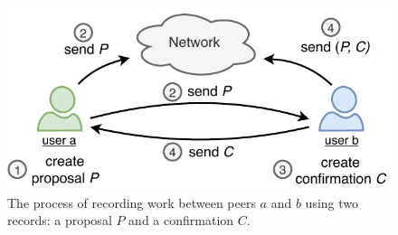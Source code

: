 

\begin{figure}[t]
	\centering
	\includegraphics[width=.75\linewidth]{trustchain/assets/interaction}
	\caption{The process of recording work between peers $ a $ and $ b $ using two records: a proposal $ P $ and a confirmation $ C $.}
	\label{fig:interaction}
\end{figure}

